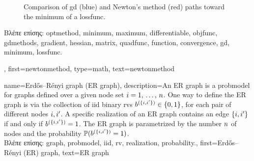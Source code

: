 {{\begin{figure}[H]
		\caption{Comparison of \gls{gd} (blue) and Newton's method (red) paths toward the \gls{minimum} of a \gls{lossfunc}. \label{fig_newtonmethod_dict}}
		\end{figure}
		\foreignlanguage{greek}{Βλέπε επίσης:} \gls{optmethod}, \gls{minimum}, \gls{maximum}, \gls{differentiable}, \gls{objfunc}, 
		\gls{gdmethods}, \gls{gradient}, \gls{hessian}, \gls{matrix}, \gls{quadfunc}, \gls{function}, \gls{convergence}, \gls{gd}, 
		\gls{minimum}, \gls{lossfunc}. },
  	first={newtonmethod},
 	type=math,
  	text={newtonmethod} 
}

{name={Erd\H{o}s–R\'enyi graph (ER graph)},
	description={An ER \gls{graph} is a \gls{probmodel} for  \gls{graph}s defined over 
		a given node set $i=1, \,\ldots, \,n$. One way to define the ER \gls{graph} is 
		via the collection of \gls{iid} binary \gls{rv}s $b^{(\{i,i'\})} \in \{0,1\}$, 
		for each pair of different nodes $i, i'$. A specific \gls{realization}  
		of an ER \gls{graph} contains an edge $\{i,i'\}$ if and only if 
		$b^{(\{i,i'\})}=1$. The ER \gls{graph} is parametrized by the 
		number $n$ of nodes and the \gls{probability} $\mathbb{P}({b^{(\{i,i'\})}=1})$. \\
		\foreignlanguage{greek}{Βλέπε επίσης:} \gls{graph}, \gls{probmodel}, \gls{iid}, \gls{rv}, \gls{realization}, \gls{probability}.},
	first={Erd\H{o}s–R\'enyi (ER) graph},
	text={ER graph}
}

